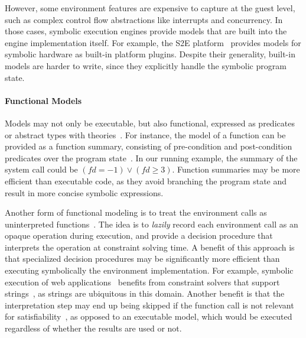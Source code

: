 However, some environment features are expensive to capture at the guest level, such as complex control flow abstractions like interrupts and concurrency.
%
In those cases, symbolic execution engines provide models that are built into the engine implementation itself.  For example, the S2E platform~\cite{s2eSystem} provides models for symbolic hardware as built-in platform plugins.
%
Despite their generality, built-in models are harder to write, since they explicitly handle the symbolic program state.

\paragraph{Functional Models}

Models may not only be executable, but also functional, expressed as predicates~\cite{slam-project,klover} or abstract types with theories~\cite{cutie-py,saxena-kudzu,klover}.
%
For instance, the model of a function can be provided as a function summary, consisting of pre-condition and post-condition predicates over the program state~\cite{klover,slam-project}.
In our running example, the summary of the  system call could be $(\mathit{fd} = -1) \vee (\mathit{fd} \geq 3)$.
%
Function summaries may be more efficient than executable code, as they avoid branching the program state and result in more concise symbolic expressions.

Another form of functional modeling is to treat the environment calls as uninterpreted functions~\cite{cutie-py,saxena-kudzu}.
%
The idea is to \emph{lazily} record each environment call as an opaque operation during execution, and provide a decision procedure that interprets the operation at constraint solving time.
%
A benefit of this approach is that specialized decision procedures may be significantly more efficient than executing symbolically the environment implementation.  For example, symbolic execution of web applications~\cite{saxena-kudzu,symjs,jalangi} benefits from constraint solvers that support strings~\cite{Z3,hampi,z3-str,s3-str}, as strings are ubiquitous in this domain.
%
Another benefit is that the interpretation step may end up being skipped if the function call is not relevant for satisfiability~\cite{cutie-py}, as opposed to an executable model, which would be executed regardless of whether the results are used or not.

\paragraph{}

